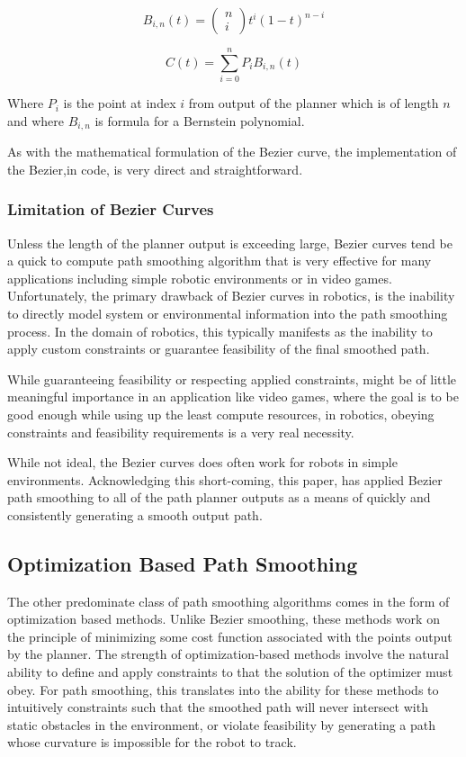 \begin{equation}
    B_{i, n}(t)=\left(\begin{array}{c}
    n \\
    i
    \end{array}\right) t^i(1-t)^{n-i}
\end{equation}

\begin{equation}
    C(t)=\sum_{i=0}^n P_i B_{i, n}(t)
\end{equation}

Where $P_i$ is the point at index $i$ from output of the planner which is of length $n$ and where $B_{i, n}$ is formula for a Bernstein polynomial. 

As with the mathematical formulation of the Bezier curve, the implementation of the Bezier,in code, is very direct and straightforward. 


\subsubsection{Limitation of Bezier Curves}
Unless the length of the planner output is exceeding large, Bezier curves tend be a quick to compute path smoothing algorithm that is very effective for many applications including simple robotic environments or in video games. Unfortunately, the primary drawback of Bezier curves in robotics, is the inability to directly model system or environmental information into the path smoothing process. In the domain of robotics, this typically manifests as the inability to apply custom constraints or guarantee feasibility of the final smoothed path.  

While guaranteeing feasibility or respecting applied constraints, might be of little meaningful importance in an application like video games, where the goal is to be good enough while using up the least compute resources, in robotics, obeying constraints and feasibility requirements is a very real necessity.

While not ideal, the Bezier curves does often work for robots in simple environments. Acknowledging this short-coming, this paper, has applied Bezier path smoothing to all of the path planner outputs as a means of quickly and consistently generating a smooth output path.


\subsection{Optimization Based Path Smoothing}
The other predominate class of path smoothing algorithms comes in the form of optimization based methods. Unlike Bezier smoothing, these methods work on the principle of minimizing some cost function associated with the points output by the planner. The strength of optimization-based methods involve the natural ability to define and apply constraints to that the solution of the optimizer must obey. For path smoothing, this translates into the ability for these methods to intuitively constraints such that the smoothed path will never intersect with static obstacles in the environment, or violate feasibility by generating a path whose curvature is impossible for the robot to track.


